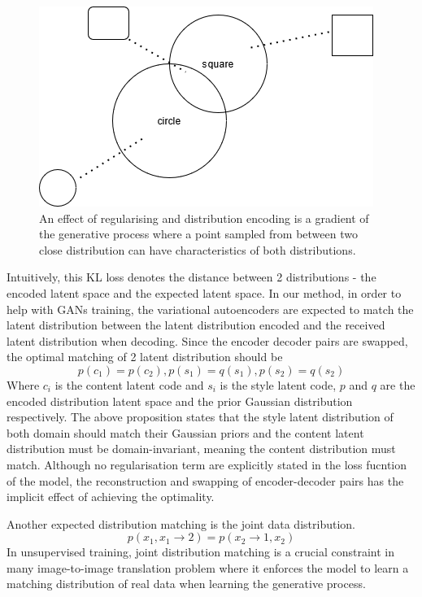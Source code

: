 \documentclass[12pt]{report}
\begin{document}
\begin{figure}[h]
	\centering
	\includegraphics[scale=0.9]{distribution-space}
	\caption{An effect of regularising and distribution encoding is a gradient of the generative process where a point sampled from between two close distribution can have characteristics of both distributions.}
	\label{fig:distribution-space}
\end{figure}

Intuitively, this KL loss denotes the distance between 2 distributions - the encoded latent space and the expected latent space. In our method, in order to help with GANs training, the variational autoencoders are expected to match the latent distribution between the latent distribution encoded and the received latent distribution when decoding. Since the encoder decoder pairs are swapped, the optimal matching of 2 latent distribution should be
\[p(c_1) = p(c_2), p(s_1) = q(s_1), p(s_2) = q(s_2)\]
 Where $c_i$ is the content latent code and $s_i$ is the style latent code, $p$ and $q$ are the encoded distribution latent space and the prior Gaussian distribution respectively. The above proposition states that the style latent distribution of both domain should match their Gaussian priors and the content latent distribution must be domain-invariant, meaning the content distribution must match. Although no regularisation term are explicitly stated in the loss fucntion of the model, the reconstruction and swapping of encoder-decoder pairs has the implicit effect of achieving the optimality.

Another expected distribution matching is the joint data distribution.
\[p(x_1, x_1\rightarrow2) = p(x_2\rightarrow1, x_2)\]
In unsupervised training, joint distribution matching is a crucial constraint in many image-to-image translation problem where it enforces the model to learn a matching distribution of real data when learning the generative process.
\end{document}
